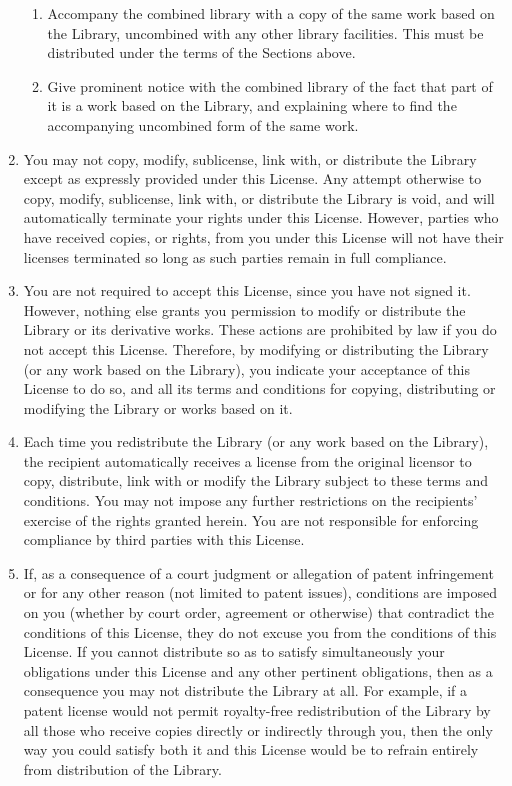 \begin{enumerate}
    \begin{enumerate}
    \item Accompany the combined library with a copy of the same work
    based on the Library, uncombined with any other library
    facilities.  This must be distributed under the terms of the
    Sections above.

    \item Give prominent notice with the combined library of the fact
    that part of it is a work based on the Library, and explaining
    where to find the accompanying uncombined form of the same work.
    \end{enumerate}

\item You may not copy, modify, sublicense, link with, or distribute
the Library except as expressly provided under this License.  Any
attempt otherwise to copy, modify, sublicense, link with, or
distribute the Library is void, and will automatically terminate your
rights under this License.  However, parties who have received copies,
or rights, from you under this License will not have their licenses
terminated so long as such parties remain in full compliance.

\item You are not required to accept this License, since you have not
signed it.  However, nothing else grants you permission to modify or
distribute the Library or its derivative works.  These actions are
prohibited by law if you do not accept this License.  Therefore, by
modifying or distributing the Library (or any work based on the
Library), you indicate your acceptance of this License to do so, and
all its terms and conditions for copying, distributing or modifying
the Library or works based on it.

\item Each time you redistribute the Library (or any work based on the
Library), the recipient automatically receives a license from the
original licensor to copy, distribute, link with or modify the Library
subject to these terms and conditions.  You may not impose any further
restrictions on the recipients' exercise of the rights granted herein.
You are not responsible for enforcing compliance by third parties with
this License.

\item If, as a consequence of a court judgment or allegation of patent
infringement or for any other reason (not limited to patent issues),
conditions are imposed on you (whether by court order, agreement or
otherwise) that contradict the conditions of this License, they do not
excuse you from the conditions of this License.  If you cannot
distribute so as to satisfy simultaneously your obligations under this
License and any other pertinent obligations, then as a consequence you
may not distribute the Library at all.  For example, if a patent
license would not permit royalty-free redistribution of the Library by
all those who receive copies directly or indirectly through you, then
the only way you could satisfy both it and this License would be to
refrain entirely from distribution of the Library.


\end{enumerate}
